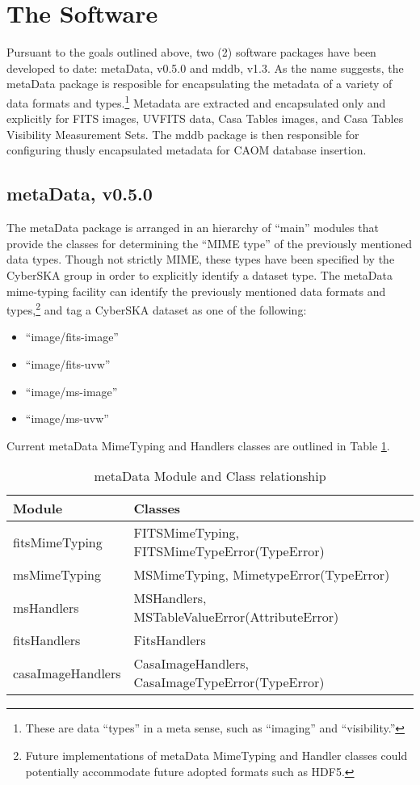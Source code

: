 \documentclass[11pt,twoside]{article}
\begin{document}
\section{The Software}
Pursuant to the goals outlined above, two (2) software packages have
been developed to date: metaData, v0.5.0 and mddb, v1.3. As the name
suggests, the metaData package is resposible for encapsulating
the metadata of a variety of data formats and types.\footnote{These
  are data ``types'' in a meta sense, such as ``imaging'' and ``visibility.''}
Metadata are extracted and encapsulated only and explicitly for FITS
images, UVFITS data, Casa Tables images, and Casa Tables Visibility
Measurement Sets. The mddb package is then responsible for configuring
thusly encapsulated metadata for CAOM database insertion.

\subsection{metaData, v0.5.0}
The metaData package \citep{and_2011} is arranged in an hierarchy of ``main'' modules
that provide the classes for determining the ``MIME type'' of the
previously mentioned data types. Though not strictly MIME, these types
have been specified by the CyberSKA group in order to explicitly
identify a dataset type. The metaData mime-typing facility can
identify the previously mentioned data formats and
types,\footnote{Future implementations of metaData MimeTyping and
  Handler classes could potentially accommodate future adopted formats
  such as HDF5.} and tag a CyberSKA dataset as one of the following:
\begin{itemize}
\item ``image/fits-image''
\item ``image/fits-uvw''
\item ``image/ms-image''
\item ``image/ms-uvw''
\end{itemize}
Current metaData MimeTyping and Handlers classes are outlined in Table \ref{tab:mods}.
\begin{table}[htbp]
  \centering
  \begin{tabular}{|l|p{9.0cm}|} 
    \hline
    \sc \textbf{Module} & \textbf{Classes} \\
    \hline
    fitsMimeTyping & FITSMimeTyping, FITSMimeTypeError(TypeError) \\
    msMimeTyping   & MSMimeTyping,   MimetypeError(TypeError) \\
    msHandlers     & MSHandlers,     MSTableValueError(AttributeError) \\
    fitsHandlers   & FitsHandlers \\
    casaImageHandlers  & CasaImageHandlers, CasaImageTypeError(TypeError)\\
    \hline
  \end{tabular}
  \caption{metaData Module and Class relationship}
  \label{tab:mods}
\end{table}
\end{document}
